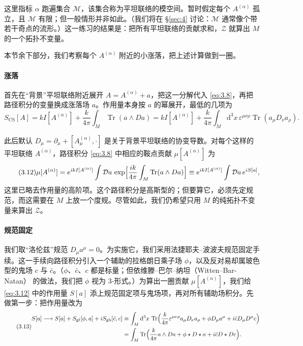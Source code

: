 \documentclass[11pt,a4paper]{article}
\newcommand{\Tr}{\operatorname{Tr}}
\newcommand{\dd}{\mathrm{d}}
\newcommand{\SCS}{S_{\mathrm{CS}}}
\begin{document}
这里指标 $\alpha$ 跑遍集合 $\mathcal{M}$，该集合称为平坦联络的模空间。暂时假定每个 $A^{(\alpha)}$ 孤立，且 $\mathcal{M}$ 有限；但一般情形并非如此。（我们将在 \S\ref{sec:4} 讨论：$\mathcal{M}$ 通常像个带若干奇点的流形。）这一练习的结果是：把所有平坦联络的贡献求和，$\mathcal{Z}$ 就算出 $M$ 的一个拓扑不变量。

本节余下部分，我们考察每个 $A^{(\alpha)}$ 附近的小涨落，把上述计算做到一圈。

\paragraph{涨落}
首先在“背景”平坦联络附近展开 $A=A^{(\alpha)}+a$，把这一分解代入 \eqref{eq:3.8}，再把路径积分的变量换成涨落场 $a$。作用量本身按 $a$ 的幂展开，最低的几项为
\begin{equation}\tag{3.11}\label{eq:3.11}
  \SCS[A] = kI[A^{(\alpha)}] + \frac{k}{4\pi}\int_M\Tr(a\wedge Da)
  = kI[A^{(\alpha)}] + \frac{k}{4\pi}\int_M\dd^3x\,\varepsilon^{\mu\nu\rho}\Tr(a_\mu D_\nu a_\rho).
\end{equation}

此后默认 $D_\mu=\partial_\mu+[A^{(\alpha)}_\mu,\cdot]$ 是关于背景平坦联络的协变导数。对每个这样的平坦联络 $A^{(\alpha)}$，路径积分 \eqref{eq:3.8} 中相应的鞍点贡献 $\mu[A^{(\alpha)}]$ 为
\begin{equation}\tag{3.12}\label{eq:3.12}
  \mu[A^{(\alpha)}] = e^{ikI[A^{(\alpha)}]}\int\mathcal{D}a\,\exp\Bigl[\frac{ik}{4\pi}\int_M\Tr(a\wedge Da)\Bigr]
  \equiv e^{ikI[A^{(\alpha)}]}\int\mathcal{D}a\,e^{iS[a]},
\end{equation}
这里已略去作用量的高阶项。这个路径积分是高斯型的；但要算它，必须先定规范，而这需要在 $M$ 上放一个度规。尽管如此，我们仍希望只用 $M$ 的纯拓扑不变量来算出 $\mathcal{Z}$。

\paragraph{规范固定}
我们取“洛伦兹”规范 $D_\mu a^\mu=0$。为实施它，我们采用法捷耶夫--波波夫规范固定手续。这一手续向路径积分引入一个辅助的拉格朗日乘子场 $\phi$，以及反对易却属玻色型的鬼场 $c$ 与 $\bar c$。（$\phi$、$\bar c$、$c$ 都是标量；但依维滕--巴尔--纳坦（Witten--Bar-Natan）\cite{barnatan1991} 的做法，我们把 $\phi$ 视为 3-形式。）为算出一圈贡献 $\mu[A^{(\alpha)}]$，我们给 \eqref{eq:3.12} 中的作用量 $S[a]$ 添上规范固定项与鬼场项，再对所有辅助场积分。先做第一步：把作用量改为
\begin{equation}\tag{3.13}\label{eq:3.13}
\begin{aligned}
  S[a] \longrightarrow S[a] + S_{\mathrm{gf}}[\phi,a] + iS_{\mathrm{gh}}[\bar c,c]
  &\equiv \int_M \dd^3x\,\Tr\Bigl(\frac{k}{4\pi}\varepsilon^{\mu\nu\rho}a_\mu D_\nu a_\rho + \phi D_\mu a^\mu + i\bar c D_\mu D^\mu c\Bigr)\\
  &= \int_M \Tr\Bigl(\frac{k}{4\pi}a\wedge Da + \phi\star D\star a + i\bar c D\star D c\Bigr).
\end{aligned}
\end{equation}
\end{document}
